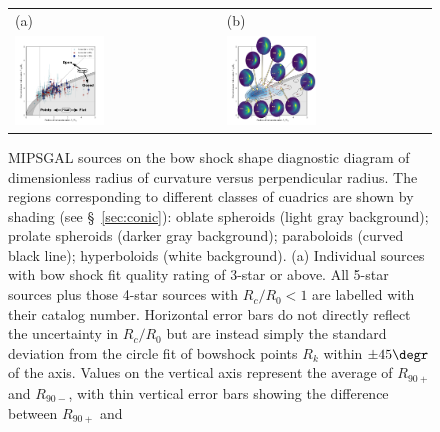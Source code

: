 \begin{figure}
  \centering
  \begin{tabular}{ll}
    (a) & (b) \\
    \includegraphics[width=0.45\textwidth, trim=0 0 30 0]
    {figs/mipsgal-Rc-R90-zoom-annotated}
        & \includegraphics[width=0.45\textwidth, trim=0 0 30 0]
          {figs/mipsgal-Rc-R90-thumbnails} 
  \end{tabular}
  \caption[]{MIPSGAL sources on the bow shock shape diagnostic diagram
    of dimensionless radius of curvature versus perpendicular radius.
    The regions corresponding to different classes of cuadrics are
    shown by shading (see \S~\ref{sec:conic}): oblate spheroids (light
    gray background); prolate spheroids (darker gray background);
    paraboloids (curved black line); hyperboloids (white background).
    (a) Individual sources with bow shock fit quality rating of 3-star
    or above.  All 5-star sources plus those 4-star sources with
    \(R_c/R_0 < 1\) are labelled with their \cite{Kobulnicky:2016a}
    catalog number.  Horizontal error bars do not directly reflect the
    uncertainty in \(R_c/R_0\) but are instead simply the standard
    deviation from the circle fit of bowshock points \(R_k\) within
    \(\pm 45\degr\) of the axis.  Values on the vertical axis
    represent the average of \(R_{90+}\) and \(R_{90-}\), with thin
    vertical error bars showing the difference between \(R_{90+}\) and
}
\end{figure}
